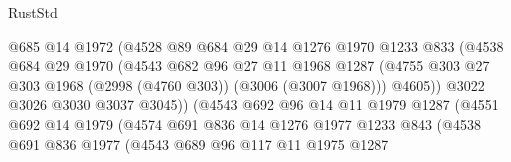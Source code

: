 \begin{lexlean}{RustStd}
\begin{coremodule}
                              @685
                              @14
                              @1972
                              (@4528
                                @89
                                @684
                                @29
                                @14
                                @1276
                                @1970
                                @1233
                                @833
                                (@4538
                                  @684
                                  @29
                                  @1970
                                  (@4543
                                    @682
                                    @96
                                    @27
                                    @11
                                    @1968
                                    @1287
                                    (@4755
                                      @303
                                      @27
                                      @303
                                      @1968
                                      (@2998 (@4760 @303))
                                      (@3006 (@3007 @1968)))
                                    @4605))
                                @3022
                                @3026
                                @3030
                                @3037
                                @3045))
                            (@4543
                              @692
                              @96
                              @14
                              @11
                              @1979
                              @1287
                              (@4551
                                @692
                                @14
                                @1979
                                (@4574
                                  @691
                                  @836
                                  @14
                                  @1276
                                  @1977
                                  @1233
                                  @843
                                  (@4538
                                    @691
                                    @836
                                    @1977
                                    (@4543
                                      @689
                                      @96
                                      @117
                                      @11
                                      @1975
                                      @1287

\end{coremodule}
\end{lexlean}
